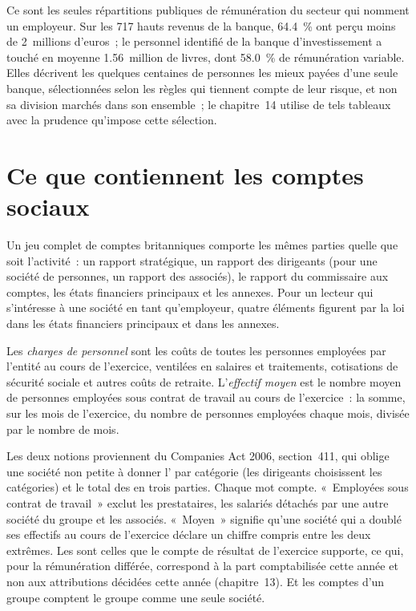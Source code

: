 Ce sont les seules répartitions publiques de rémunération du secteur qui nomment un employeur. Sur les 717 hauts revenus de la banque,
64.4~\% ont perçu moins de 2~millions d'euros~; le personnel identifié de la banque d'investissement a touché en moyenne 1.56~million de livres, dont 58.0~\%
de rémunération variable. Elles décrivent les quelques centaines de personnes les mieux payées d'une seule banque, sélectionnées selon les règles qui tiennent compte de leur risque, et non
sa division marchés dans son ensemble~; le chapitre~14 utilise de tels tableaux avec la prudence qu'impose cette sélection.

\section{Ce que contiennent les comptes sociaux}

Un jeu complet de comptes britanniques comporte les mêmes parties quelle que soit l'activité~: un rapport stratégique, un rapport des dirigeants (pour une société de personnes, un rapport des associés), le rapport du commissaire aux comptes, les états financiers principaux et les annexes.
Pour un lecteur qui s'intéresse à une société en tant qu'employeur, quatre éléments figurent par la loi dans les états financiers principaux et dans les annexes.

\begin{definition}\label{def:in:reading-a-trading-firms-accounts:staff}
Les \emph{charges de personnel} sont les coûts de toutes les personnes employées par l'entité au cours de l'exercice, ventilées
en salaires et traitements, cotisations de sécurité sociale et autres coûts de retraite. L'\emph{effectif moyen}
est le nombre moyen de personnes employées sous contrat de travail au cours
de l'exercice~: la somme, sur les mois de l'exercice, du nombre de personnes employées chaque mois, divisée par le nombre de mois.
\end{definition}

Les deux notions proviennent du Companies Act 2006, section~411, qui oblige une société non petite à donner l'
par catégorie (les dirigeants choisissent les catégories) et le total des  en trois parties. Chaque mot compte.
«~Employées sous contrat de travail~» exclut les prestataires, les salariés détachés par une autre société du groupe et
les associés. «~Moyen~» signifie qu'une société qui a doublé ses effectifs au cours de l'exercice déclare un chiffre compris entre les deux extrêmes.
Les  sont celles que le compte de résultat de l'exercice supporte, ce qui, pour la rémunération différée, correspond à la part comptabilisée cette
année et non aux attributions décidées cette année (chapitre~13). Et les comptes d'un groupe comptent le groupe comme une seule société.

